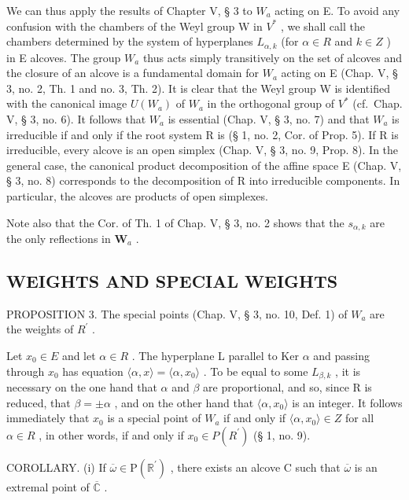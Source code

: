 We can thus apply the results of Chapter V, § 3 to \(W_{a}\) acting on E. To avoid any confusion with the chambers of the Weyl group W in \(V^{*}\) , we shall call the chambers determined by the system of hyperplanes \(L_{\alpha,k}\) (for \(\alpha \in R\) and \(k \in Z\) ) in E alcoves. The group \(W_{a}\) thus acts simply transitively on the set of alcoves and the closure of an alcove is a fundamental domain for \(W_{a}\) acting on E (Chap. V, § 3, no. 2, Th. 1 and no. 3, Th. 2). It is clear that the Weyl group W is identified with the canonical image \(U(W_{a})\) of \(W_{a}\) in the orthogonal group of \(V^{*}\) (cf.~Chap. V, § 3, no. 6). It follows that \(W_{a}\) is essential (Chap. V, § 3, no. 7) and that \(W_{a}\) is irreducible if and only if the root system R is (§ 1, no. 2, Cor. of Prop. 5). If R is irreducible, every alcove is an open simplex (Chap. V, § 3, no. 9, Prop. 8). In the general case, the canonical product decomposition of the affine space E (Chap. V, § 3, no. 8) corresponds to the decomposition of R into irreducible components. In particular, the alcoves are products of open simplexes.

Note also that the Cor. of Th. 1 of Chap. V, § 3, no. 2 shows that the \(s_{\alpha,k}\) are the only reflections in \(\mathbf{W}_a\) .

\subsection{WEIGHTS AND SPECIAL WEIGHTS}

PROPOSITION 3. The special points (Chap. V, § 3, no. 10, Def. 1) of \(W_{a}\) are the weights of \(R^{\prime}\) .

Let \(x_0 \in E\) and let \(\alpha \in R\) . The hyperplane L parallel to Ker \(\alpha\) and passing through \(x_0\) has equation \(\langle \alpha, x \rangle = \langle \alpha, x_0 \rangle\) . To be equal to some \(L_{\beta,k}\) , it is necessary on the one hand that \(\alpha\) and \(\beta\) are proportional, and so, since R is reduced, that \(\beta = \pm \alpha\) , and on the other hand that \(\langle \alpha, x_0 \rangle\) is an integer. It follows immediately that \(x_0\) is a special point of \(W_a\) if and only if \(\langle \alpha, x_0 \rangle \in Z\) for all \(\alpha \in R\) , in other words, if and only if \(x_0 \in P(R^{\prime})\) (§ 1, no. 9).

COROLLARY. (i) If \(\overline{\omega} \in \mathrm{P}(\mathbb{R}^{\prime})\) , there exists an alcove C such that \(\overline{\omega}\) is an extremal point of \(\overline{\mathbb{C}}\) .

